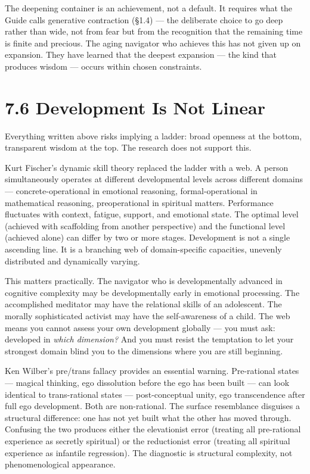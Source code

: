 The deepening container is an achievement, not a default. It requires what the Guide calls generative contraction (§1.4) — the deliberate choice to go deep rather than wide, not from fear but from the recognition that the remaining time is finite and precious. The aging navigator who achieves this has not given up on expansion. They have learned that the deepest expansion — the kind that produces wisdom — occurs within chosen constraints.


\section*{7.6 Development Is Not Linear}


Everything written above risks implying a ladder: broad openness at the bottom, transparent wisdom at the top. The research does not support this.


Kurt Fischer's dynamic skill theory replaced the ladder with a web. A person simultaneously operates at different developmental levels across different domains — concrete-operational in emotional reasoning, formal-operational in mathematical reasoning, preoperational in spiritual matters. Performance fluctuates with context, fatigue, support, and emotional state. The optimal level (achieved with scaffolding from another perspective) and the functional level (achieved alone) can differ by two or more stages. Development is not a single ascending line. It is a branching web of domain-specific capacities, unevenly distributed and dynamically varying.


This matters practically. The navigator who is developmentally advanced in cognitive complexity may be developmentally early in emotional processing. The accomplished meditator may have the relational skills of an adolescent. The morally sophisticated activist may have the self-awareness of a child. The web means you cannot assess your own development globally — you must ask: developed in \textit{which dimension?} And you must resist the temptation to let your strongest domain blind you to the dimensions where you are still beginning.


Ken Wilber's pre/trans fallacy provides an essential warning. Pre-rational states — magical thinking, ego dissolution before the ego has been built — can look identical to trans-rational states — post-conceptual unity, ego transcendence after full ego development. Both are non-rational. The surface resemblance disguises a structural difference: one has not yet built what the other has moved through. Confusing the two produces either the elevationist error (treating all pre-rational experience as secretly spiritual) or the reductionist error (treating all spiritual experience as infantile regression). The diagnostic is structural complexity, not phenomenological appearance.


